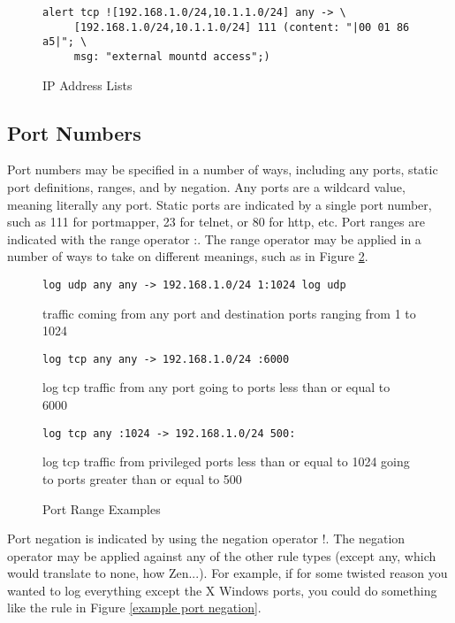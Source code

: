 \documentclass[english]{report}
\begin{document}
%
\begin{figure}[!hbpt]
\begin{verbatim}
alert tcp ![192.168.1.0/24,10.1.1.0/24] any -> \
     [192.168.1.0/24,10.1.1.0/24] 111 (content: "|00 01 86 a5|"; \
     msg: "external mountd access";)
\end{verbatim}

\caption{\label{IP list usage}IP Address Lists}
\end{figure}



\subsection{Port Numbers}

Port numbers may be specified in a number of ways, including any
ports, static port definitions, ranges, and by negation. Any
ports are a wildcard value, meaning literally any port. Static ports
are indicated by a single port number, such as 111 for portmapper,
23 for telnet, or 80 for http, etc. Port ranges are indicated with
the range operator :. The range operator may be
applied in a number of ways to take on different meanings, such as
in Figure \ref{port range examples}.

%
\begin{figure}[!hbpt]
\begin{verbatim}
log udp any any -> 192.168.1.0/24 1:1024 log udp 
\end{verbatim}
traffic coming from any port and destination ports ranging from 1
to 1024

\begin{verbatim}
log tcp any any -> 192.168.1.0/24 :6000 
\end{verbatim}
log tcp traffic from any port going to ports less than or equal to
6000

\begin{verbatim}
log tcp any :1024 -> 192.168.1.0/24 500: 
\end{verbatim}
log tcp traffic from privileged ports less than or equal to 1024 going
to ports greater than or equal to 500


\caption{\label{port range examples}Port Range Examples}
\end{figure}


Port negation is indicated by using the negation operator !.
The negation operator may be applied against any of the other rule
types (except any, which would translate to none, how Zen...). For
example, if for some twisted reason you wanted to log everything except
the X Windows ports, you could do something like the rule in Figure
\ref{example port negation}.
\end{document}
